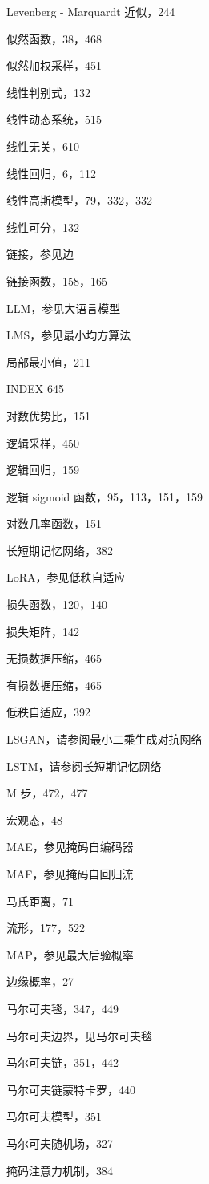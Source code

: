 \documentclass[10pt]{report}
\begin{document}
Levenberg - Marquardt 近似，244

似然函数，38，468

似然加权采样，451

线性判别式，132

线性动态系统，515

线性无关，610

线性回归，6，112

线性高斯模型，79，332，332

线性可分，132

链接，参见边

链接函数，158，165

LLM，参见大语言模型

LMS，参见最小均方算法

局部最小值，211

INDEX 645

对数优势比，151

逻辑采样，450

逻辑回归，159

逻辑 sigmoid 函数，95，113，151，159

对数几率函数，151

长短期记忆网络，382

LoRA，参见低秩自适应

损失函数，120，140

损失矩阵，142

无损数据压缩，465

有损数据压缩，465

低秩自适应，392

LSGAN，请参阅最小二乘生成对抗网络

LSTM，请参阅长短期记忆网络

M 步，472，477

宏观态，48

MAE，参见掩码自编码器

MAF，参见掩码自回归流

马氏距离，71

流形，177，522

MAP，参见最大后验概率

边缘概率，27

马尔可夫毯，347，449

马尔可夫边界，见马尔可夫毯

马尔可夫链，351，442

马尔可夫链蒙特卡罗，440

马尔可夫模型，351

马尔可夫随机场，327

掩码注意力机制，384
\end{document}
